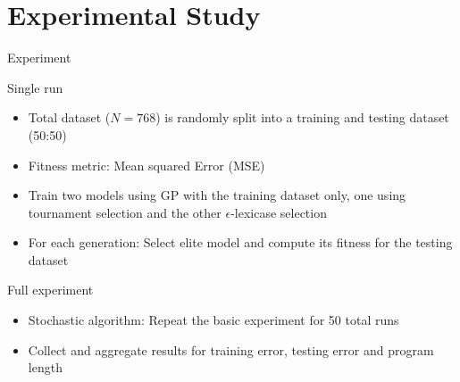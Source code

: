 \documentclass[
  ignorenonframetext,
]{beamer}
\providecommand{\tightlist}{%
  \setlength{\itemsep}{0pt}\setlength{\parskip}{0pt}}
\begin{document}
\hypertarget{experimental-study}{%
\section{Experimental Study}\label{experimental-study}}


\begin{frame}{Experiment}
\protect\hypertarget{experiment}{}
\begin{block}{Single run}
\protect\hypertarget{single-run}{}
\begin{itemize}
\tightlist
\item
  Total dataset (\(N=768\)) is randomly split into a training and
  testing dataset (50:50)
\item
  Fitness metric: Mean squared Error (MSE)
\item
  Train two models using GP with the training dataset only, one using
  tournament selection and the other \(\epsilon\)-lexicase selection
\item
  For each generation: Select elite model and compute its fitness for
  the testing dataset
\end{itemize}
\end{block}

\begin{block}{Full experiment}
\protect\hypertarget{full-experiment}{}
\begin{itemize}
\tightlist
\item
  Stochastic algorithm: Repeat the basic experiment for 50 total runs
\item
  Collect and aggregate results for training error, testing error and
  program length
\end{itemize}
\end{block}
\end{frame}
\end{document}
